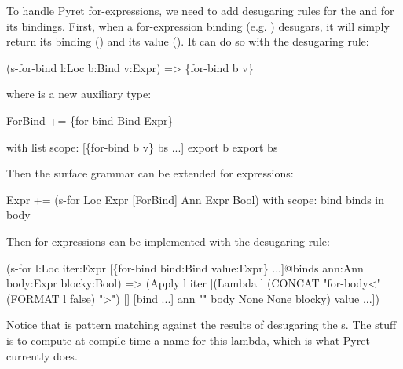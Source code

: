 To handle Pyret for-expressions, we need to add desugaring rules for
the  and for its bindings. 
First, when a for-expression binding (e.g. ) desugars,
it will simply return its binding () and its value ().
It can do so with the desugaring rule:
\begin{Codes}
   (s-for-bind l:Loc b:Bind v:Expr)
=> \{for-bind b v\}
\end{Codes}
where  is a new auxiliary type:
\begin{Codes}
ForBind += \{for-bind Bind Expr\}

with list scope:
  [\{for-bind b v\} bs ...]
  export b
  export bs
\end{Codes}

Then the surface grammar can be extended for  expressions:
\begin{Codes}
Expr += (s-for Loc Expr [ForBind] Ann Expr Bool)
with scope:
  bind binds in body
\end{Codes}

Then for-expressions can be implemented with the desugaring rule:
\begin{Codes}
   (s-for l:Loc
          iter:Expr
          [\{for-bind bind:Bind value:Expr\} ...]@binds
          ann:Ann
          body:Expr
          blocky:Bool)
=> (Apply l iter
     [(Lambda l (CONCAT "for-body<" (FORMAT l false) ">")
        [] [bind ...] ann "" body None None blocky)
      value ...])
\end{Codes}

Notice that  is pattern matching against the results of
desugaring the s. The  stuff is to
compute at compile time a name for this lambda, which is what Pyret
currently does.

\newcommand{\C}{\(\sb{c}\)}
